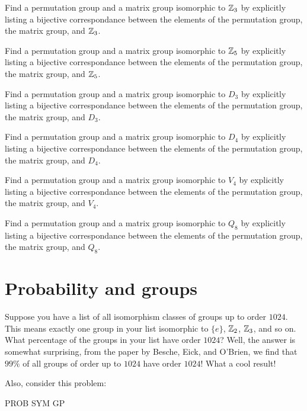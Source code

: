 \documentclass{ximera}
\begin{document}
\begin{exercise}
  Find a permutation group and a matrix group isomorphic to $\mathbb Z_3$ by
  explicitly listing a bijective correspondance between the elements
  of the permutation group, the matrix group, and $\mathbb Z_3$.
\end{exercise}


\begin{exercise}
  Find a permutation group and a matrix group isomorphic to $\mathbb Z_5$ by
  explicitly listing a bijective correspondance between the elements
  of the permutation group, the matrix group, and $\mathbb Z_5$.
\end{exercise}



\begin{exercise}
  Find a permutation group and a matrix group isomorphic to $D_3$ by
  explicitly listing a bijective correspondance between the elements
  of the permutation group, the matrix group, and $D_3$.
\end{exercise}


\begin{exercise}
  Find a permutation group and a matrix group isomorphic to $D_4$ by
  explicitly listing a bijective correspondance between the elements
  of the permutation group, the matrix group, and $D_4$.
\end{exercise}



\begin{exercise}
  Find a permutation group and a matrix group isomorphic to $V_4$ by
  explicitly listing a bijective correspondance between the elements
  of the permutation group, the matrix group, and $V_4$.
\end{exercise}


\begin{exercise}
  Find a permutation group and a matrix group isomorphic to $Q_8$ by
  explicitly listing a bijective correspondance between the elements
  of the permutation group, the matrix group, and $Q_8$.
\end{exercise}








\section{Probability and groups}


Suppose you have a list of all isomorphism classes of groups up to
order $1024$. This means exactly one group in your list isomorphic to
$\{e\}$, $\mathbb Z_2$, $\mathbb Z_3$, and so on. What percentage of the groups in
your list have order $1024$? Well, the answer is somewhat surprising, from the paper  by Besche, Eick, and O'Brien, we find that $99\%$ of all groups of order up to $1024$ have order $1024$! What a cool result!

Also, consider this problem:

PROB SYM GP
\end{document}
